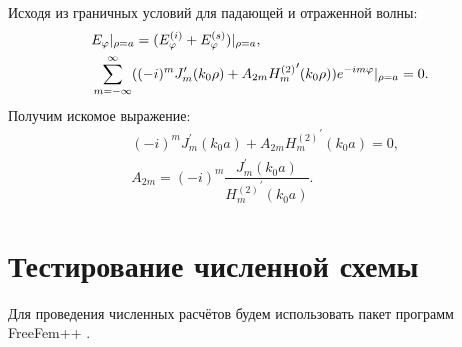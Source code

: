 Исходя из граничных условий для падающей и отраженной волны:
\begin{align}
&E_{\varphi}|_{\rho=a} = (E_{\varphi}^{(i)} + E_{\varphi}^{(s)})|_{\rho=a},\notag\\ &\sum_{m=-\infty}^{\infty}
((-i)^{m}J_{m}^{\prime}(k_{0}\rho) + A_{2m}{H_{m}^{(2)}}^{\prime}(k_{0}\rho))e^{-im\varphi}|_{\rho=a} = 0.
\end{align}
Получим искомое выражение:
\begin{align}
&(-i)^{m}J_{m}^{\prime}(k_{0}a) + A_{2m}{H_{m}^{(2)}}^{\prime}(k_{0}a) = 0,\\
&A_{2m} = (-i)^{m} \dfrac{J_{m}^{\prime}(k_{0}a)}
{{H_{m}^{(2)}}^{\prime}(k_{0}a)}.
\end{align}


\section{Тестирование численной схемы}
Для проведения численных расчётов будем использовать пакет программ FreeFem++ \cite{bfreefem}.

